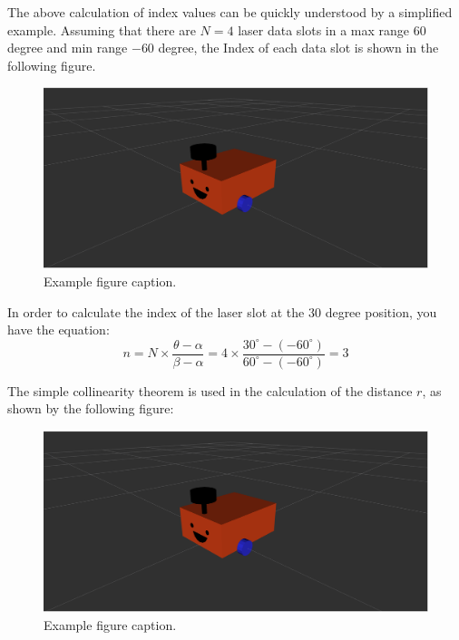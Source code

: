 The above calculation of index values can be quickly understood by a simplified example. Assuming that there are $N=4$ laser data slots in a max range $60$ degree and min range $-60$ degree, the Index of each data slot is shown in the following figure.
\begin{figure}[H]
    \centering
    \includegraphics[width=0.8\linewidth]{figs/robot.png}
    \caption{Example figure caption.}
\end{figure}
In order to calculate the index of the laser slot at the 30 degree position, you have the equation: 
\begin{equation}
    n=N\times\frac{\theta-\alpha}{\beta-\alpha}=4\times\frac{30^\circ-(-60^\circ)}{60^\circ-(-60^\circ) }=3
\end{equation}

The simple collinearity theorem is used in the calculation of the distance $r$, as shown by the following figure:
\begin{figure}[H]
    \centering
    \includegraphics[width=0.8\linewidth]{figs/robot.png}
    \caption{Example figure caption.}
\end{figure}

